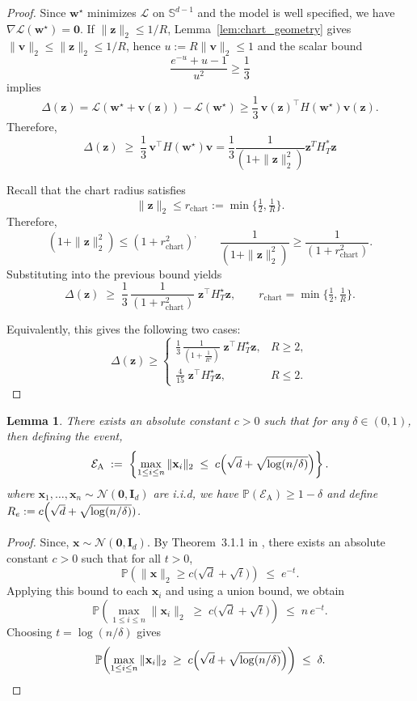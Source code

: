 \documentclass{article}
\theoremstyle{plain}
\newtheorem{lemma}[theorem]{Lemma}
\theoremstyle{definition}
\theoremstyle{remark}
\begin{document}
{\begin{proof}
Since $\mathbf w^\star$ minimizes $\mathcal L$ on $\mathbb S^{d-1}$ and the model is well specified, we have
$\nabla\mathcal L(\mathbf w^\star)=\mathbf 0$.
If $\|\mathbf z\|_2\le 1/R$, Lemma~\ref{lem:chart_geometry} gives $\|\mathbf v\|_2\le \|\mathbf z\|_2\le 1/R$, hence
$u:=R\|\mathbf v\|_2\le 1$ and the scalar bound
\[
\frac{e^{-u}+u-1}{u^2}\ge \frac13
\]
implies
\[
\Delta(\mathbf z)=\mathcal L(\mathbf w^\star+\mathbf v(\mathbf z))-\mathcal L(\mathbf w^\star)
\ge \frac13\,\mathbf v(\mathbf z)^\top H(\mathbf w^\star)\mathbf v(\mathbf z).
\]
Therefore,
\[
\Delta(\mathbf z)
\;\ge\;
\frac13\,\mathbf v^\top H(\mathbf w^\star)\mathbf v= \frac13\frac{1}{(1+\|\mathbf z\|^2_{2}) }\mathbf z^{T}H^{*}_{T}\mathbf z
\]

Recall that the chart radius satisfies
\[
\|\mathbf{z}\|_2 \le r_{\mathrm{chart}} := \min\Big\{\tfrac12,\tfrac1R\Big\}.
\]
Therefore,
\[
(1+\|\mathbf{z}\|_2^2) \le (1+r_{\mathrm{chart}}^2)^,
\qquad
\frac{1}{(1+\|\mathbf{z}\|_2^2)} \ge \frac{1}{(1+r_{\mathrm{chart}}^2)}.
\]
Substituting into the previous bound yields
\[
\Delta(\mathbf{z})
\;\ge\;
\frac{1}{3}\,\frac{1}{(1+r_{\mathrm{chart}}^2)}\;
\mathbf{z}^\top H_T^\star \mathbf{z},
\qquad
r_{\mathrm{chart}}=\min\Big\{\tfrac12,\tfrac1R\Big\}.
\]

Equivalently, this gives the following two cases:
\[
\Delta(\mathbf{z})\ge
\begin{cases}
\displaystyle
\frac{1}{3}\,\frac{1}{\left(1+\frac{1}{R^2}\right)}\;
\mathbf{z}^\top H_T^\star \mathbf{z},
& R\ge 2, \\[1.2ex]
\displaystyle
\frac{4}{15}\;
\mathbf{z}^\top H_T^\star \mathbf{z},
& R\le 2.
\end{cases}
\]

\end{proof}

\begin{lemma}
\label{lem:gaussnorm}
There exists an absolute constant $c>0$ such that for any $\delta\in(0,1)$,
then defining the event,
\begin{equation}
\mathcal E_{\mathrm A}
\;:=\;
\left\{
\max_{1\le i\le n}\|\mathbf x_i\|_2
\;\le\;
c\Bigl(\sqrt d+\sqrt{\log(n/\delta)}\Bigr)
\right\}.
\end{equation}
where $\mathbf x_1,\dots,\mathbf x_n\sim\mathcal N(\mathbf 0,\mathbf I_d)$ are i.i.d, we have $\mathbb{P}(\mathcal E_{\mathrm A}) \geq 1-\delta$ and define $R_{e}:=c\Bigl(\sqrt d+\sqrt{\log(n/\delta)})$. 
\end{lemma}


\begin{proof}
Since, $\mathbf x\sim\mathcal N(\mathbf 0,\mathbf I_d)$. By Theorem~3.1.1 in \cite{vershynin2018high}, 
there exists an absolute constant $c>0$ such that for all $t>0$,
\[
\mathbb P\!\left(\|\mathbf x\|_2 \ge c\bigl(\sqrt d+\sqrt t\bigr)\right)
\;\le\; e^{-t}.
\]
Applying this bound to each $\mathbf x_i$ and using a union bound, we obtain
\[
\mathbb P\!\left(
\max_{1\le i\le n}\|\mathbf x_i\|_2
\;\ge\;
c\bigl(\sqrt d+\sqrt t\bigr)
\right)
\;\le\;
n\,e^{-t}.
\]
Choosing $t=\log(n/\delta)$ gives
\[
\mathbb P\!\left(
\max_{1\le i\le n}\|\mathbf x_i\|_2
\;\ge\;
c\Bigl(\sqrt d+\sqrt{\log(n/\delta)}\Bigr)
\right)
\;\le\;
\delta.
\]
\end{proof}


}
\end{document}
